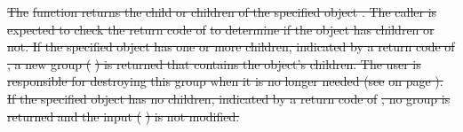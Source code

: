 \documentclass[12pt]{report} %
\providecommand{\DIFdeltex}[1]{{\protect\color{red}\sout{#1}}}                      %
\providecommand{\DIFdelbegin}{} %
\providecommand{\DIFdel}[1]{\texorpdfstring{\DIFdeltex{#1}}{}} %
\newcommand{\DIFscaledelfig}{0.5}
\newlength{\DIFdelgraphicswidth} %
\newlength{\DIFdelgraphicsheight} %
\newcommand{\DIFdelincludegraphics}[2][]{%
\sbox{\DIFdelgraphicsbox}{\DIFOincludegraphics[#1]{#2}}%
\settoboxwidth{\DIFdelgraphicswidth}{\DIFdelgraphicsbox} %
\settoboxtotalheight{\DIFdelgraphicsheight}{\DIFdelgraphicsbox} %
\scalebox{\DIFscaledelfig}{%
\parbox[b]{\DIFdelgraphicswidth}{\usebox{\DIFdelgraphicsbox}\\[-\baselineskip] \rule{\DIFdelgraphicswidth}{0em}}\llap{\resizebox{\DIFdelgraphicswidth}{\DIFdelgraphicsheight}{%
\setlength{\unitlength}{\DIFdelgraphicswidth}%
\begin{picture}(1,1)%
\thicklines\linethickness{2pt} %
{\color[rgb]{1,0,0}\put(0,0){\framebox(1,1){}}}%
{\color[rgb]{1,0,0}\put(0,0){\line( 1,1){1}}}%
{\color[rgb]{1,0,0}\put(0,1){\line(1,-1){1}}}%
\end{picture}%
}\hspace*{3pt}}} %
} %
\DeclareRobustCommand{\DIFdelbegin}{\DIFOdelbegin \let\includegraphics\DIFdelincludegraphics} %
\begin{document}
\DIFdelbegin %


\DIFdel{The }%
\DIFdel{function returns the child or children of the specified object .
The caller is expected to check the return code of }%
\DIFdel{to determine if the object has children or not.
If the specified object has one or more children, indicated by a return code of }%
\DIFdel{, a new group (}%
\DIFdel{) is returned that contains the object's children.
The user is responsible for destroying this group when it is no longer needed (see }%
\DIFdel{on page \pageref{func:GrpDestroy}).
If the specified object has no children, indicated by a return code of }%
\DIFdel{, no group is returned and the input (}%
\DIFdel{) is not modified.
}%

\end{document}
